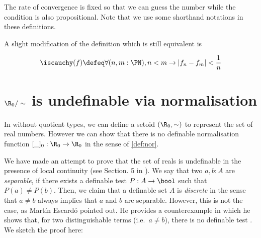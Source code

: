 The rate of convergence is fixed so that we can guess the number while the condition is also propositional. Note that we use some shorthand notations in these definitions.


A slight modification of the definition which is still equivalent is

\begin{equation}\label{R03}
\iscauchy(f) \defeq \forall (n,m :\PN), n < m \to \vert f_n -
  f_m \vert  < \frac{1}{n}
\end{equation}



\section{$\R_0/\sim$ is undefinable via normalisation}

In \itt without quotient types, we can define a setoid $(\R_0,\sim)$ to represent the set of real numbers. However we can show that there is no definable normalisation function $[\_]_0: \R_0 \to \R_0$ in the sense of \ref{def:nor}.


We have made an attempt to prove that the set of reals is undefinable in the presence of local continuity (see Section. 5 in \cite{aan}). 
We say that two $a,b : A$ are \emph{separable}, if there exists a definable test $P : A \to \bool$ such that $P(a) \neq P(b)$. 
Then, we claim that a definable set $A$ is \emph{discrete} in the sense that $a \neq b$ always implies that $a$ and $b$ are separable. However, this is not the case, as  Martín Escardó pointed out.
He provides a counterexample in which he shows that, for two distinguishable terms (i.e.\ $a \neq b$), there is no definable test \cite{martinsproof}. We sketch the proof here:

